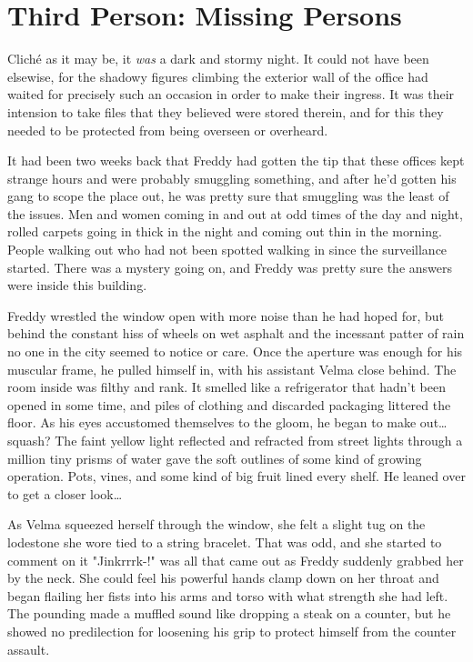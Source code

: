 \section[Third Person]{Third Person: Missing Persons}

\hspace{\parindent} Clich\'{e} as it may be, it \textit{was} a dark and stormy night. It could not have been elsewise, for the shadowy figures climbing the exterior wall of the office had waited for precisely such an occasion in order to make their ingress. It was their intension to take files that they believed were stored therein, and for this they needed to be protected from being overseen or overheard.

It had been two weeks back that Freddy had gotten the tip that these offices kept strange hours and were probably smuggling something, and after he'd gotten his gang to scope the place out, he was pretty sure that smuggling was the least of the issues. Men and women coming in and out at odd times of the day and night, rolled carpets going in thick in the night and coming out thin in the morning. People walking out who had not been spotted walking in since the surveillance started. There was a mystery going on, and Freddy was pretty sure the answers were inside this building.

Freddy wrestled the window open with more noise than he had hoped for, but behind the constant hiss of wheels on wet asphalt and the incessant patter of rain no one in the city seemed to notice or care. Once the aperture was enough for his muscular frame, he pulled himself in, with his assistant Velma close behind. The room inside was filthy and rank. It smelled like a refrigerator that hadn't been opened in some time, and piles of clothing and discarded packaging littered the floor. As his eyes accustomed themselves to the gloom, he began to make out\ldots{} squash? The faint yellow light reflected and refracted from street lights through a million tiny prisms of water gave the soft outlines of some kind of growing operation. Pots, vines, and some kind of big fruit lined every shelf. He leaned over to get a closer look\ldots{}

As Velma squeezed herself through the window, she felt a slight tug on the lodestone she wore tied to a string bracelet. That was odd, and she started to comment on it "Jinkrrrk-!" was all that came out as Freddy suddenly grabbed her by the neck. She could feel his powerful hands clamp down on her throat and began flailing her fists into his arms and torso with what strength she had left. The pounding made a muffled sound like dropping a steak on a counter, but he showed no predilection for loosening his grip to protect himself from the counter assault.

